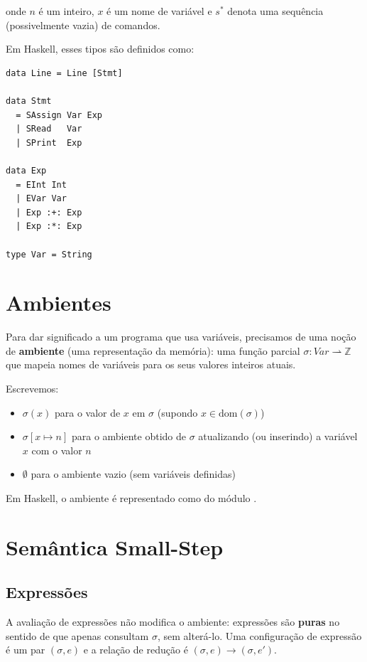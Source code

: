 onde \(n\) é um inteiro, \(x\) é um nome de variável e \(s^*\) denota
uma sequência (possivelmente vazia) de comandos.

Em Haskell, esses tipos são definidos como:

\begin{verbatim}
data Line = Line [Stmt]

data Stmt
  = SAssign Var Exp
  | SRead   Var
  | SPrint  Exp

data Exp
  = EInt Int
  | EVar Var
  | Exp :+: Exp
  | Exp :*: Exp

type Var = String
\end{verbatim}

\section{Ambientes}

Para dar significado a um programa que usa variáveis, precisamos de
uma noção de \textbf{ambiente} (uma representação da memória): uma
função parcial \(\sigma : \mathit{Var}
\rightharpoonup \mathbb{Z}\) que mapeia nomes de variáveis para os
seus valores inteiros atuais.

Escrevemos:

\begin{itemize}
  \item \(\sigma(x)\) para o valor de \(x\) em \(\sigma\) (supondo \(x
    \in \mathrm{dom}(\sigma)\))
  \item \(\sigma[x \mapsto n]\) para o ambiente obtido de \(\sigma\)
    atualizando (ou inserindo) a variável \(x\) com o valor \(n\)
  \item \(\emptyset\) para o ambiente vazio (sem variáveis definidas)
\end{itemize}

Em Haskell, o ambiente é representado como
 do módulo
.

\section{Semântica Small-Step}

\subsection{Expressões}

A avaliação de expressões não modifica o ambiente: expressões são
\textbf{puras} no sentido de que apenas consultam \(\sigma\), sem
alterá-lo. Uma configuração de expressão é um par \((\sigma, e)\) e a
relação de redução é \((\sigma, e) \to (\sigma, e')\).

